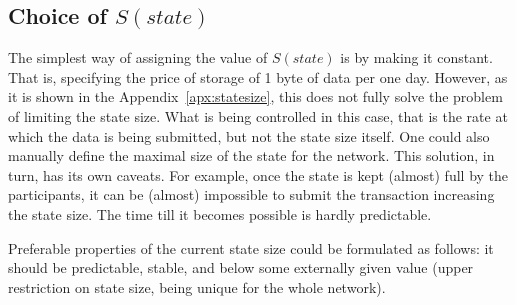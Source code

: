 \documentclass[]{llncs}   %
\begin{document}
\subsection{Choice of $S(state)$}

The simplest way of assigning the value of $S(state)$ is by making it constant.
That is, specifying the price of storage of 1 byte of data per one day. However,
as it is shown in the Appendix~\ref{apx:statesize}, this does not fully solve
the problem of limiting the state size. What is being controlled in this case,
that is the rate at which the data is being submitted, but not the state size
itself. One could also manually define the maximal size of the state for the
network. This solution, in turn, has its own caveats. For example, once the
state is kept (almost) full by the participants, it can be (almost) impossible
to submit the transaction increasing the state size.  The time till it becomes
possible is hardly predictable. 

Preferable properties of the current state size could be formulated as follows:
it should be predictable, stable, and below some externally given value (upper
restriction on state size, being unique for the whole network). 
\end{document}
